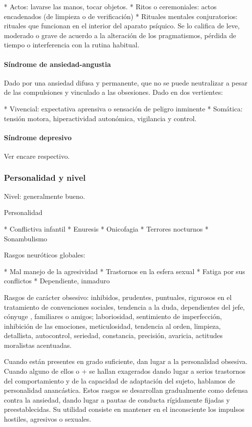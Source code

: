 \documentclass[encares.tex]{subfiles}
\begin{document}
* Actos: lavarse las manos, tocar objetos.
* Ritos o ceremoniales: actos encadenados (de limpieza o de verificación)
* Rituales mentales conjuratorios: rituales que funcionan en el interior del aparato psíquico. Se lo califica de leve, moderado o grave de acuerdo a la alteración de los pragmatismos, pérdida de tiempo o interferencia con la rutina habitual.

\paragraph{Síndrome de ansiedad-angustia}

Dado por una ansiedad difusa y permanente, que no se puede neutralizar a pesar de las compulsiones y vinculado a las obsesiones. Dado en dos vertientes:

* Vivencial: expectativa aprensiva o sensación de peligro inminente
* Somática: tensión motora, hiperactividad autonómica, vigilancia y control.

\paragraph{Síndrome depresivo}

Ver encare respectivo.

\subsubsection*{Personalidad y nivel}

Nivel: generalmente bueno.

Personalidad

* Conflictiva infantil
* Enuresis
* Onicofagia
* Terrores nocturnos
* Sonambulismo

Rasgos neuróticos globales:

* Mal manejo de la agresividad
* Trastornos en la esfera sexual
* Fatiga por sus conflictos
* Dependiente, inmaduro

Rasgos de carácter obsesivo: inhibidos, prudentes, puntuales, rigurosos en el tratamiento de convenciones sociales, tendencia a la duda, dependientes del jefe, cónyuge , familiares o amigos; laboriosidad, sentimiento de imperfección, inhibición de las emociones, meticulosidad, tendencia al orden, limpieza, detallista, autocontrol, seriedad, constancia, precisión, avaricia, actitudes moralistas acentuadas.

Cuando están presentes en grado suficiente, dan lugar a la personalidad obsesiva. Cuando alguno de ellos o + se hallan exagerados dando lugar a serios trastornos del comportamiento y de la capacidad de adaptación del sujeto, hablamos de personalidad anancástica. Estos rasgos se desarrollan gradualmente como defensa contra la ansiedad, dando lugar a pautas de conducta rígidamente fijadas y preestablecidas. Su utilidad consiste en mantener en el inconsciente los impulsos hostiles, agresivos o sexuales.
\end{document}
